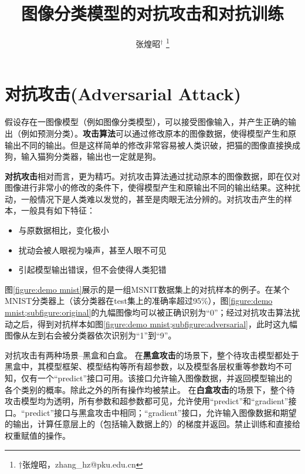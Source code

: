 \documentclass[journal, a4paper]{IEEEtran}
\begin{document}
	\title{图像分类模型的对抗攻击和对抗训练}
    \author{张煌昭$^\dagger$
    \thanks{$\dagger$张煌昭，zhang\_hz@pku.edu.cn}}
	\maketitle

\section{对抗攻击(Adversarial Attack)}
\label{section:adversarial attack}

假设存在一图像模型（例如图像分类模型），可以接受图像输入，并产生正确的输出（例如预测分类）。\textbf{攻击算法}可以通过修改原本的图像数据，使得模型产生和原输出不同的输出。但是这样简单的修改非常容易被人类识破，把猫的图像直接换成狗，输入猫狗分类器，输出也一定就是狗。

\textbf{对抗攻击}相对而言，更为精巧。对抗攻击算法通过扰动原本的图像数据，即在仅对图像进行非常小的修改的条件下，使得模型产生和原输出不同的输出结果。这种扰动，一般情况下是人类难以发觉的，甚至是肉眼无法分辨的。对抗攻击产生的样本，一般具有如下特征：

\begin{itemize}
    \item 与原数据相比，变化极小
    \item 扰动会被人眼视为噪声，甚至人眼不可见
    \item 引起模型输出错误，但不会使得人类犯错
\end{itemize}

图\ref{figure:demo mnist}展示的是一组MSNIT数据集上的对抗样本的例子。在某个MNIST分类器上（该分类器在test集上的准确率超过95\%），图\ref{figure:demo mnist;subfigure:original}的九幅图像均可以被正确识别为``0''；经过对抗攻击算法扰动之后，得到对抗样本如图\ref{figure:demo mnist;subfigure:adversarial}，此时这九幅图像从左到右会被分类器依次识别为``1''到``9''。

对抗攻击有两种场景--黑盒和白盒。
在\textbf{黑盒攻击}的场景下，整个待攻击模型都处于黑盒中，其模型框架、模型结构等所有超参数，以及模型各层权重等参数均不可知，仅有一个``predict''接口可用。该接口允许输入图像数据，并返回模型输出的各个类别的概率。除此之外的所有操作均被禁止。
在\textbf{白盒攻击}的场景下，整个待攻击模型均为透明，所有参数和超参数都可见，允许使用``predict''和``gradient''接口。``predict''接口与黑盒攻击中相同；``gradient''接口，允许输入图像数据和期望的输出，计算任意层上的（包括输入数据上的）的梯度并返回。禁止训练和直接给权重赋值的操作。
\end{document}
